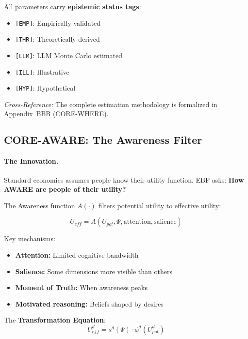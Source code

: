 All parameters carry \textbf{epistemic status tags}:
\begin{itemize}[nosep]
\item \texttt{[EMP]}: Empirically validated
\item \texttt{[THR]}: Theoretically derived
\item \texttt{[LLM]}: LLM Monte Carlo estimated
\item \texttt{[ILL]}: Illustrative
\item \texttt{[HYP]}: Hypothetical
\end{itemize}

\textit{Cross-Reference:} The complete estimation methodology is formalized
in Appendix~BBB (CORE-WHERE).

\subsection{CORE-AWARE: The Awareness Filter}
\label{sec:10c-aware}

\paragraph{The Innovation.}
Standard economics assumes people know their utility function. EBF asks:
\textbf{How AWARE are people of their utility?}

The Awareness function $A(\cdot)$ filters potential utility to effective utility:

\begin{equation}
U_{eff} = A(U_{pot}, \Psi, \text{attention}, \text{salience})
\end{equation}

Key mechanisms:
\begin{itemize}[nosep]
\item \textbf{Attention:} Limited cognitive bandwidth
\item \textbf{Salience:} Some dimensions more visible than others
\item \textbf{Moment of Truth:} When awareness peaks
\item \textbf{Motivated reasoning:} Beliefs shaped by desires
\end{itemize}

The \textbf{Transformation Equation}:
\begin{equation}
U_{eff}^d = s^d(\Psi) \cdot \phi^d(U_{pot}^d)
\end{equation}

